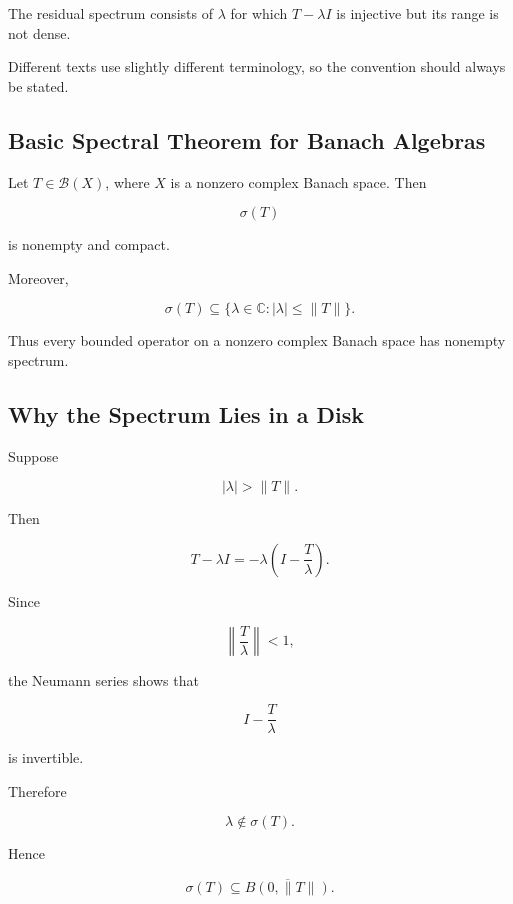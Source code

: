 The residual spectrum consists of \(\lambda\) for which \(T-\lambda I\)
is injective but its range is not dense.

Different texts use slightly different terminology, so the convention
should always be stated.

\subsection{Basic Spectral Theorem for Banach Algebras}
\label{subsec:basic-spectrum-properties}

\begin{theorem}
Let \(T\in\mathcal{B}(X)\), where \(X\) is a nonzero complex Banach space.
Then

\[
\boxed{
\sigma(T)
}
\]

is nonempty and compact.

Moreover,

\[
\boxed{
\sigma(T)
\subseteq
\{
\lambda\in\mathbb{C}:|\lambda|\leq\|T\|
\}.
}
\]
\end{theorem}

Thus every bounded operator on a nonzero complex Banach space has
nonempty spectrum.

\subsection{Why the Spectrum Lies in a Disk}
\label{subsec:spectral-disk}

Suppose

\[
|\lambda|>\|T\|.
\]

Then

\[
T-\lambda I
=
-\lambda
\left(
I-\frac{T}{\lambda}
\right).
\]

Since

\[
\left\|
\frac{T}{\lambda}
\right\|
<1,
\]

the Neumann series shows that

\[
I-\frac{T}{\lambda}
\]

is invertible.

Therefore

\[
\lambda\notin\sigma(T).
\]

Hence

\[
\boxed{
\sigma(T)
\subseteq
\overline{B(0,\|T\|)}.
}
\]


